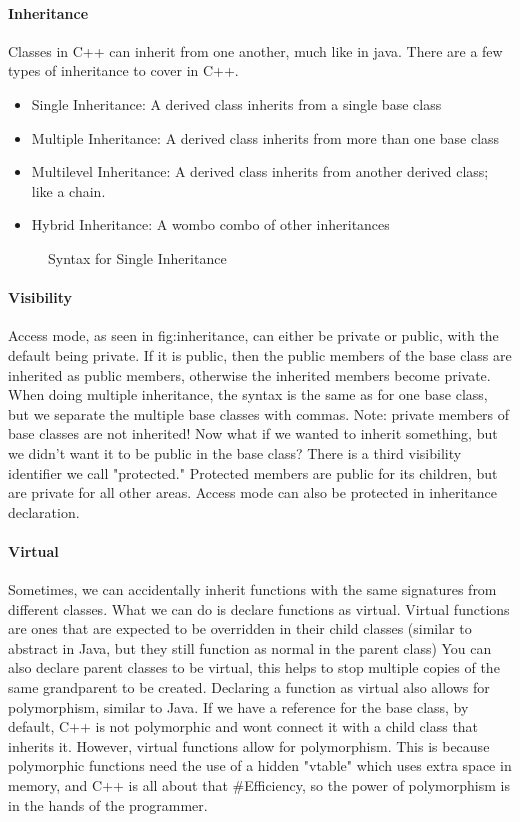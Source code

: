 \paragraph{Inheritance} Classes in C++ can inherit from one another, much like in java. There are a few types of inheritance to cover in C++.
\begin{itemize}
	\item Single Inheritance: A derived class inherits from a single base class
	\item Multiple Inheritance: A derived class inherits from more than one base class
	\item Multilevel Inheritance: A derived class inherits from another derived class; like a chain.
	\item Hybrid Inheritance: A wombo combo of other inheritances
\end{itemize}
\begin{figure}[!htb]
	\caption{\label{fig:inheritance} Syntax for Single Inheritance}
\end{figure}
\paragraph{Visibility} Access mode, as seen in \figurename{fig:inheritance}, can either be private or public, with the default being private. If it is public, then the public members of the base class are inherited as public members, otherwise the inherited members become private. When doing multiple inheritance, the syntax is the same as for one base class, but we separate the multiple base classes with commas. Note: private members of base classes are not inherited! \newline
Now what if we wanted to inherit something, but we didn't want it to be public in the base class? There is a third visibility identifier we call "protected." Protected members are public for its children, but are private for all other areas. Access mode can also be protected in inheritance declaration. 
\paragraph{Virtual} Sometimes, we can accidentally inherit functions with the same signatures from different classes. What we can do is declare functions as virtual. Virtual functions are ones that are expected to be overridden in their child classes (similar to abstract in Java, but they still function as normal in the parent class) You can also declare parent classes to be virtual, this helps to stop multiple copies of the same grandparent to be created. \newline
Declaring a function as virtual also allows for polymorphism, similar to Java. If we have a reference for the base class, by default, C++ is not polymorphic and wont connect it with a child class that inherits it. However, virtual functions allow for polymorphism. This is because polymorphic functions need the use of a hidden "vtable" which uses extra space in memory, and C++ is all about that \#Efficiency, so the power of polymorphism is in the hands of the programmer. 

